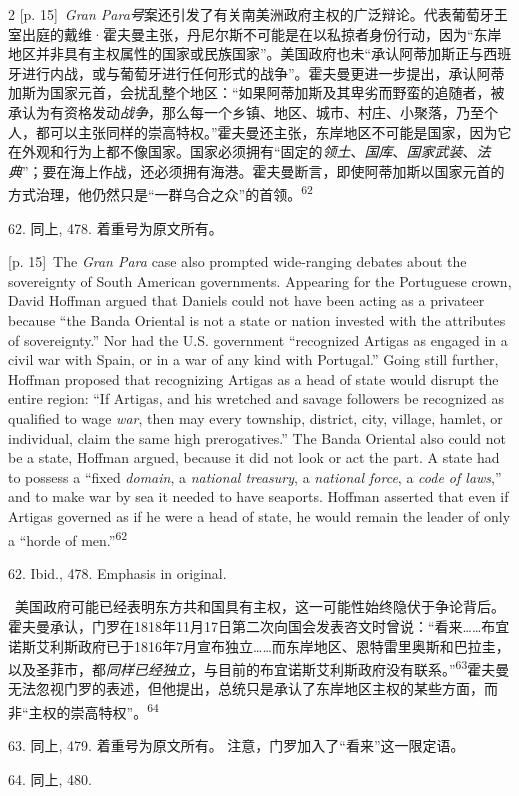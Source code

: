 \documentclass[10pt,a4paper]{article}
\begin{document}
\begin{paracol}{2}
{\scriptsize\color{gray} [p. 15]}\ \textit{Gran Para号}案还引发了有关南美洲政府主权的广泛辩论。代表葡萄牙王室出庭的戴维·霍夫曼主张，丹尼尔斯不可能是在以私掠者身份行动，因为“东岸地区并非具有主权属性的国家或民族国家”。美国政府也未“承认阿蒂加斯正与西班牙进行内战，或与葡萄牙进行任何形式的战争”。霍夫曼更进一步提出，承认阿蒂加斯为国家元首，会扰乱整个地区：“如果阿蒂加斯及其卑劣而野蛮的追随者，被承认为有资格发动\textit{战争}，那么每一个乡镇、地区、城市、村庄、小聚落，乃至个人，都可以主张同样的崇高特权。”霍夫曼还主张，东岸地区不可能是国家，因为它在外观和行为上都不像国家。国家必须拥有“固定的\textit{领土}、\textit{国库}、\textit{国家武装}、\textit{法典}”；要在海上作战，还必须拥有海港。霍夫曼断言，即使阿蒂加斯以国家元首的方式治理，他仍然只是“一群乌合之众”的首\mbox{领。\textsuperscript{62}}\par{\small 62. 同上, 478. 着重号为原文所有。\par}
\switchcolumn
{\scriptsize\color{gray} [p. 15]}\ The \textit{Gran Para} case also prompted wide-ranging debates about the sovereignty of South American governments. Appearing for the Portuguese crown, David Hoffman argued that Daniels could not have been acting as a privateer because “the Banda Oriental is not a state or nation invested with the attributes of sovereignty.” Nor had the U.S. government “recognized Artigas as engaged in a civil war with Spain, or in a war of any kind with Portugal.” Going still further, Hoffman proposed that recognizing Artigas as a head of state would disrupt the entire region: “If Artigas, and his wretched and savage followers be recognized as qualified to wage \textit{war}, then may every township, district, city, village, hamlet, or individual, claim the same high prerogatives.” The Banda Oriental also could not be a state, Hoffman argued, because it did not look or act the part. A state had to possess a “fixed \textit{domain}, a \textit{national treasury}, a \textit{national force}, a \textit{code of laws},” and to make war by sea it needed to have seaports. Hoffman asserted that even if Artigas governed as if he were a head of state, he would remain the leader of only a “horde of men.”\nobreak\textsuperscript{62}\par{\small 62. Ibid., 478. Emphasis in original.\par}
\switchcolumn*
{\scriptsize\color{gray} [p. 16]}\ 美国政府可能已经表明东方共和国具有主权，这一可能性始终隐伏于争论背后。霍夫曼承认，门罗在1818年11月17日第二次向国会发表咨文时曾说：“看来……布宜诺斯艾利斯政府已于1816年7月宣布独立……而东岸地区、恩特雷里奥斯和巴拉圭，以及圣菲市，都\textit{同样已经独立}，与目前的布宜诺斯艾利斯政府没有联系。”\nobreak\textsuperscript{63}霍夫曼无法忽视门罗的表述，但他提出，总统只是承认了东岸地区主权的某些方面，而非“主权的崇高特权”。\nobreak\textsuperscript{64}\par{\small 63. 同上, 479. 着重号为原文所有。 注意，门罗加入了“看来”这一限定语。\par}{\small 64. 同上, 480.\par}

\end{paracol}
\end{document}
